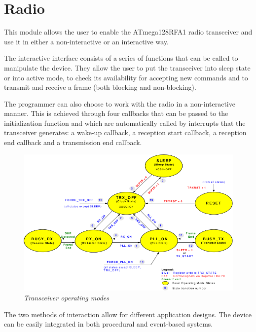 \section{Radio}

This module allows the user to enable the \mbox{ATmega128RFA1} radio
transceiver and use it in either a non-interactive or an interactive way. 

The interactive interface consists of a series of functions that can be called
to manipulate the device. They allow the user to put the transceiver into sleep
state or into active mode, to check its availability for accepting new commands
and to transmit and receive a frame (both blocking and non-blocking).

The programmer can also choose to work with the radio in a non-interactive
manner. This is achieved through four callbacks that can be passed to the
initialization function and which are automatically called by interrupts that
the transceiver generates: a wake-up callback, a reception start callback, a
reception end callback and a transmission end callback.

\begin{figure}[ht]
	\begin{center}
		\includegraphics[width=\textwidth]
		{img/transceiver_operating_modes.png}
	\end{center}
	\caption{\small \itshape{Transceiver operating
	modes\protect\footnotemark}}
	\label{fig:transceiver_operating_modes}
\end{figure}

The two methods of interaction allow for different application designs.  The
device can be easily integrated in both procedural and event-based systems.

